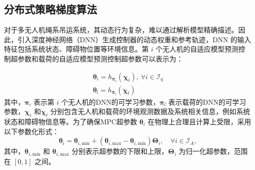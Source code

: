\documentclass[lang=chs, degree=master, blindreview=true, winfonts=true]{yanputhesis}
\begin{document}



\subsection{分布式策略梯度算法}
对于多无人机绳系吊运系统，其动态行为复杂，难以通过解析模型精确描述。因此，引入深度神经网络（DNN）生成控制器的动态权重和参考轨迹，DNN 的输入特征包括系统状态、障碍物位置等环境信息。第 \(i\) 个无人机的自适应模型预测控制超参数和载荷的自适应模型预测控制超参数可以表示为：

\begin{equation}
	\label{4}
	\begin{gathered}
		\boldsymbol{\theta}_i=h_{\boldsymbol{\pi}_i}\left(\boldsymbol{\chi}_i\right),\mathrm{~}\forall i\in\mathcal{I}_q\\    
		\boldsymbol{\theta}_l=h_{\boldsymbol{\pi}_l}\left(\boldsymbol{\chi}_l\right)
	\end{gathered}
\end{equation}
其中，\( \bm \pi_i \) 表示第 \(i\) 个无人机的DNN的可学习参数，\( \bm \pi_l \) 表示载荷的DNN的可学习参数，\( \bm \chi_i \) 和\( \bm \chi_l \) 分别包含无人机和载荷的环境观测数据及系统相关信息，例如系统状态和障碍物信息等。为了确保MPC超参数 \( \bm \theta_i \) 在物理上合理且计算上受限，采用以下参数化形式：
\begin{equation}
    \bm \theta_i = \bm \theta_{i,\text{min}} + \left( \bm \theta_{i,\text{max}} - \bm \theta_{i,\text{min}} \right) \bm \Theta_i, \quad \forall i \in \mathcal{I}_A,
\end{equation}
其中，\( \bm \theta_{i,\text{min}} \) 和 \( \bm \theta_{i,\text{max}} \) 分别表示超参数的下限和上限，\( \bm \Theta_i \) 为归一化超参数，范围在 \([\text{0}, \text{1}]\) 之间。
\end{document}
